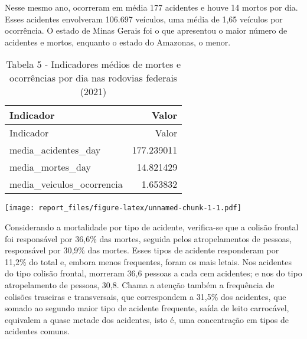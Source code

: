 \documentclass[
]{article}
\begin{document}
Nesse mesmo ano, ocorreram em média 177 acidentes e houve 14 mortos por
dia. Esses acidentes envolveram 106.697 veículos, uma média de 1,65
veículos por ocorrência. O estado de Minas Gerais foi o que apresentou o
maior número de acidentes e mortos, enquanto o estado do Amazonas, o
menor.

\begin{longtable}[]{@{}lr@{}}
\caption{Tabela 5 - Indicadores médios de mortes e ocorrências por dia
nas rodovias federais (2021)}\tabularnewline
\toprule
Indicador & Valor \\
\midrule
\endfirsthead
\toprule
Indicador & Valor \\
\midrule
\endhead
media\_acidentes\_day & 177.239011 \\
media\_mortes\_day & 14.821429 \\
media\_veiculos\_ocorrencia & 1.653832 \\
\bottomrule
\end{longtable}

\texttt{[image: report\_files/figure-latex/unnamed-chunk-1-1.pdf]}

Considerando a mortalidade por tipo de acidente, verifica-se que a
colisão frontal foi responsável por 36,6\% das mortes, seguida pelos
atropelamentos de pessoas, responsável por 30,9\% das mortes. Esses
tipos de acidente responderam por 11,2\% do total e, embora menos
frequentes, foram os mais letais. Nos acidentes do tipo colisão frontal,
morreram 36,6 pessoas a cada cem acidentes; e nos do tipo atropelamento
de pessoas, 30,8. Chama a atenção também a frequência de colisões
traseiras e transversais, que correspondem a 31,5\% dos acidentes, que
somado ao segundo maior tipo de acidente frequente, saída de leito
carrocável, equivalem a quase metade dos acidentes, isto é, uma
concentração em tipos de acidentes comuns.
\end{document}
